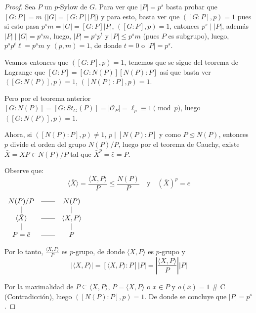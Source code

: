 \begin{proof}
    Sea $P$ un $p$-Sylow de $G$. Para ver que $|P|=p^s$ basta probar que $[G:P]=m$ ($|G|=[G:P]|P|$) y para esto, basta ver que $([G:P], p)=1$ pues si esto pasa $p^s m = |G| = [G:P]|P|$, $([G:P], p)=1$, entonces $p^s \mid |P|$, además $|P| \mid |G| = p^s m$, luego, $|P| = p^s p^t$ y $|P| \le p^s m$ (pues $P$ es subgrupo), luego, $p^s p^t \ell = p^s m$ y $(p, m)=1$, de donde $t=0$ o $|P|=p^s$.

    Veamos entonces que $([G:P], p)=1$, tenemos que se sigue del teorema de Lagrange que $[G:P] = [G:N(P)][N(P):P]$ así que basta ver $([G:N(P)], p)=1$, $([N(P):P], p)=1$.
    
    Pero por el teorema anterior $[G:N(P)] = [G:St_G(P)] = |\mathcal{O}_P| = \ell_p \equiv 1 \pmod p$, luego $([G:N(P)], p) = 1$.
    
    Ahora, si $([N(P):P], p) \neq 1$, $p \mid [N(P):P]$ y como $P \trianglelefteq N(P)$, entonces $p$ divide el orden del grupo $N(P)/P$, luego por el teorema de Cauchy, existe $\bar{X} = X P \in N(P)/P$ tal que $\bar{X}^p = \bar{e} = P$.
    
    Observe que:
    \begin{equation*}
        \langle \bar{X} \rangle = \frac{\langle X, P \rangle}{P} \le \frac{N(P)}{P} \quad \text{y} \quad (\bar{X})^p = e
    \end{equation*}
    
    \begin{center}
    $\begin{array}{ccc}
         N(P)/P & \rule[2pt]{20pt}{0.5pt} & N(P) \\
         | & & | \\
         \langle \bar{X} \rangle & \rule[2pt]{20pt}{0.5pt} & \langle X, P \rangle \\
         | & & | \\
         P=\bar{e} & \rule[2pt]{20pt}{0.5pt} & P
    \end{array}$
    \end{center}

    Por lo tanto, $\frac{\langle X, P \rangle}{P}$ es $p$-grupo, de donde $\langle X, P \rangle$ es $p$-grupo y
    \begin{equation*}
        |\langle X, P \rangle| = [\langle X, P \rangle : P] |P| = \left| \frac{\langle X, P \rangle}{P} \right| |P|
    \end{equation*}
    
    Por la maximalidad de $P \subseteq \langle X, P \rangle$, $P = \langle X, P \rangle$ o $x \in P$ y $o(\bar{x})=1$ \# C (Contradicción), luego $([N(P): P], p)=1$.
    De donde se concluye que $|P| = p^s$.
\end{proof}


